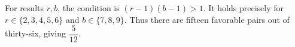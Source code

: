 For results $r,b$, the condition is $(r-1)(b-1)>1$. It holds precisely for $r\in\{2,3,4,5,6\}$ and $b\in\{7,8,9\}$. Thus there are fifteen favorable pairs out of thirty-six, giving $\boxed{\dfrac{5}{12}}$.
